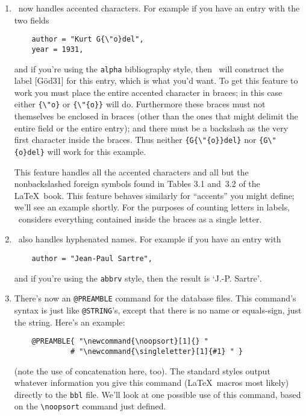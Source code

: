\begin{enumerate}
\item
\BibTeX\ now handles accented characters.
For example if you have an entry with the two fields
\begin{verbatim}
    author = "Kurt G{\"o}del",
    year = 1931,
\end{verbatim}
and if you're using the \hbox{\tt alpha} bibliography style,
then \BibTeX\ will construct the label
\hbox{[G{\"o}d31]} for this entry, which is what you'd want.
To get this feature to work you must place the entire accented
character in braces;
in this case either \hbox{\verb|{\"o}|}
or \hbox{\verb|{\"{o}}|} will do.
Furthermore these braces must not themselves be
enclosed in braces (other than the ones that might delimit
the entire field or the entire entry);
and there must be a backslash
as the very first character inside the braces.
Thus neither \hbox{\verb|{G{\"{o}}del}|}
nor \hbox{\verb|{G\"{o}del}|} will work for this example.

This feature handles all the accented characters and
all but the nonbackslashed foreign symbols found in Tables
3.1 and~3.2 of the \LaTeX\ book.
This feature behaves similarly for ``accents'' you might define;
we'll see an example shortly.
For the purposes of counting letters in labels,
\BibTeX\ considers everything contained inside the braces
as a single letter.

\item
\BibTeX\ also handles hyphenated names.
For example if you have an entry with
\begin{verbatim}
    author = "Jean-Paul Sartre",
\end{verbatim}
and if you're using the \hbox{\tt abbrv} style,
then the result is `J.-P. Sartre'$\!$.

\item
\label{preamble}
There's now an \hbox{\verb|@PREAMBLE|} command
for the database files.
This command's syntax is just like \hbox{\verb|@STRING|}'s,
except that there is no name or equals-sign, just the string.
Here's an example:
\begin{verbatim}
    @PREAMBLE{ "\newcommand{\noopsort}[1]{} "
             # "\newcommand{\singleletter}[1]{#1} " }
\end{verbatim}
(note the use of concatenation here, too).
The standard styles output whatever information you give this command
(\LaTeX\ macros most likely) directly to the {\tt bbl} file.
We'll look at one possible use of this command,
based on the \hbox{\verb|\noopsort|} command just defined.


\end{enumerate}
